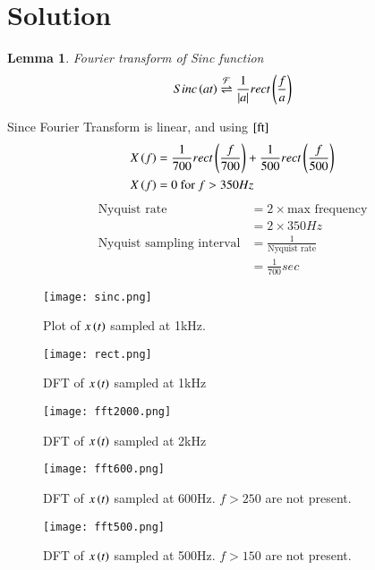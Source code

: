 \documentclass[journal,12pt,twocolumn]{IEEEtran}
\newtheorem{lemma}[theorem]{Lemma}
\begin{document}
\section{Solution}
\begin{lemma}{Fourier transform of Sinc function}
\begin{align}
    Sinc\left(at\right) \overset{\mathcal{F}}{ \rightleftharpoons} \frac{1}{|a|}rect\left(\frac{f}{a}\right)\label{ft}
\end{align}
\end{lemma}
Since Fourier Transform is linear, and using $\eqref{ft}$
\begin{align}
    X\left(f\right)&=\frac{1}{700}rect\left(\frac{f}{700}\right)+\frac{1}{500}rect\left(\frac{f}{500}\right)\\
    X\left(f\right)&=0  \text{   for } f>350Hz
\end{align}
\begin{align}
    \text{Nyquist rate} &= 2 \times \text{max frequency}\\
    &= 2\times 350 Hz\\
    \text{Nyquist sampling interval} &= \frac{1}{\text{Nyquist rate}}\\
    &= \frac{1}{700}sec
\end{align}
\begin{figure}[!h]
 \centering
 \texttt{[image: sinc.png]}
 \caption{Plot of $x\left(t\right)$ sampled at 1kHz.} 
\end{figure}
\begin{figure}[!h]
 \centering
 \texttt{[image: rect.png]}
 \caption{DFT of $x\left(t\right)$ sampled at 1kHz} 
\end{figure}
\begin{figure}[!h]
 \centering
 \texttt{[image: fft2000.png]}
 \caption{DFT of $x\left(t\right)$ sampled at 2kHz} 
\end{figure}
\begin{figure}[!h]
 \centering
 \texttt{[image: fft600.png]}
 \caption{DFT of $x\left(t\right)$ sampled at 600Hz. $f>250$ are not present.} 
\end{figure}
\begin{figure}[!h]
 \centering
 \texttt{[image: fft500.png]}
 \caption{DFT of $x\left(t\right)$ sampled at 500Hz. $f>150$ are not present.} 
\end{figure}
\end{document}
